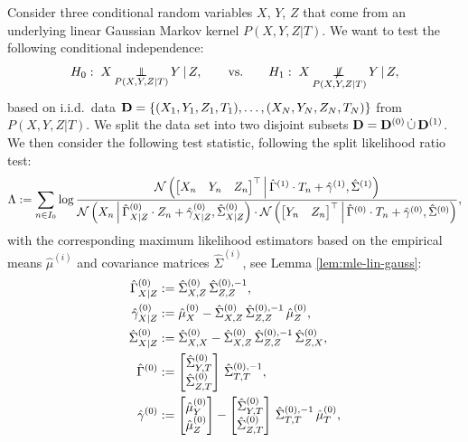 \begin{Rem}
  Consider three conditional random variables $X$, $Y$, $Z$ that come from an underlying linear Gaussian Markov kernel $P(X,Y,Z|T)$.
  We want to test the following conditional independence:
  \[H_0:\; X \operatorname*{\perp\mkern-11mu\perp}_{P(X,Y,Z|T)} Y \operatorname*{|} Z, \qquad \text{vs.} \qquad H_1:\; X \operatorname*{\not\mkern-2mu\perp\mkern-11mu\perp}_{P(X,Y,Z|T)} Y \operatorname*{|} Z, \]
  based on i.i.d.\ data $\mathbf{D} = \left \{ (X_1,Y_1,Z_1,T_1),\dots,(X_N,Y_N,Z_N,T_N) \right \}$ from $P(X,Y,Z|T)$.
  We split the data set into two disjoint subsets $\mathbf{D} = \mathbf{D}^{(0)} \,\dot{\cup}\, \mathbf{D}^{(1)}$.
  We then consider the following test statistic, following the split likelihood ratio test:
  \[ \Lambda := \sum_{n \in I_0}  %
  \log \frac{\Ncal\lp \matb{X_n&Y_n&Z_n}^\top\st \hat\Gamma^{(1)}\cdot T_n+\hat\gamma^{(1)},\hat\Sigma^{(1)}\rp}{ \Ncal\lp X_n\st \hat\Gamma_{X|Z}^{(0)}\cdot Z_n+\hat\gamma_{X|Z}^{(0)},\hat\Sigma_{X|Z}^{(0)}\rp \cdot \Ncal\lp \matb{Y_n&Z_n}^\top\st \hat\Gamma^{(0)}\cdot T_n+\hat\gamma^{(0)},\hat\Sigma^{(0)}\rp },  \]
  with the corresponding maximum likelihood estimators based on the empirical means $\hat\mu^{(i)}$ and covariance matrices $\hat\Sigma^{(i)}$, see Lemma \ref{lem:mle-lin-gauss}:
  \begin{align*}
  \hat\Gamma_{X|Z}^{(0)} &:= \hat\Sigma_{X,Z}^{(0)} \,{\hat\Sigma_{Z,Z}^{(0),-1}},\\
  \hat\gamma_{X|Z}^{(0)} &:= \hat\mu_X^{(0)} - \hat\Sigma_{X,Z}^{(0)} \,{\hat\Sigma_{Z,Z}^{(0),-1}}\,\hat\mu_Z^{(0)},\\
  \hat\Sigma_{X|Z}^{(0)} &:= \hat\Sigma_{X,X}^{(0)} -\hat\Sigma_{X,Z}^{(0)}\,{\hat\Sigma_{Z,Z}^{(0),-1}}\,\hat\Sigma_{Z,X}^{(0)},\\
      \hat\Gamma^{(0)} &:= \matb{\hat\Sigma_{Y,T}^{(0)}\\\hat\Sigma_{Z,T}^{(0)}} \,{\hat\Sigma_{T,T}^{(0),-1}},\\
      \hat\gamma^{(0)} &:= \matb{\hat\mu_Y^{(0)}\\\hat\mu_Z^{(0)}} - \matb{\hat\Sigma_{Y,T}^{(0)}\\\hat\Sigma_{Z,T}^{(0)}} \,{\hat\Sigma_{T,T}^{(0),-1}}\,\hat\mu_T^{(0)}, \\

\end{align*}
\end{Rem}

